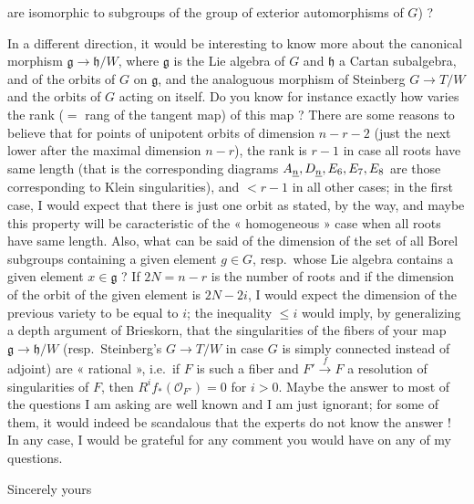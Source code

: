 \documentclass[11pt,a4paper]{article}
\begin{document}

are isomorphic to subgroups of the group of exterior automorphisms of $G$) ?

In a different direction, it would be interesting to know more about the
canonical morphism $\mathfrak{g} \to \mathfrak{h}/W$, where $\mathfrak{g}$ is
the Lie algebra of $G$ and $\mathfrak{h}$ a Cartan subalgebra, and of the orbits
of $G$ on $\mathfrak{g}$, and the analoguous morphism of Steinberg
$G \to T/W$ and the orbits of $G$ acting on itself. Do you know for instance
exactly how varies the rank ($=$ rang of the tangent map) of this map ? There
are some reasons to believe that for points of unipotent orbits of dimension
$n-r-2$ (just the next lower after the maximal dimension $n-r$), the
rank is $r-1$ in case all roots have same length (that is the corresponding
diagrams $A_{\uncertain{n}}, D_{\uncertain{n}}, E_6, E_7, E_8$ are those
corresponding to Klein singularities), and $< r-1$ in all other cases; in
the first case, I would expect that there is just one orbit as stated, by the
way, and maybe this property will be caracteristic of the « homogeneous » case
when all roots have same length. Also, what can be said of the dimension of the
set of all Borel subgroups containing a given element $g \in G$, resp.\ whose
Lie algebra contains a given element $x \in \mathfrak{g}$ ? If $2N = n-r$ is
the number of roots and if the dimension of the orbit of the given element is
$2N-2i$, I would expect the dimension of the previous variety to be equal to
$i$; the inequality $\leqslant i$ would imply, by generalizing a depth argument
of Brieskorn, that the singularities of the fibers of your map
$\mathfrak{g} \to \mathfrak{h}/W$ (resp.\ Steinberg's $G \to T/W$ in case $G$
is simply connected instead of adjoint) are « rational », i.e.\ if $F$ is such a
fiber and $F' \xrightarrow{f} F$ a resolution of singularities of $F$, then
$R^{i} f_{*}(\mathcal{O}_{F'}) = 0$ for $i > 0$. Maybe the answer to most of
the questions I am asking are well known and I am just ignorant; for some of
them, it would indeed be scandalous that the experts do not know the answer !
In any case, I would be grateful for any comment you would have on any of my
questions.

Sincerely yours
\end{document}
